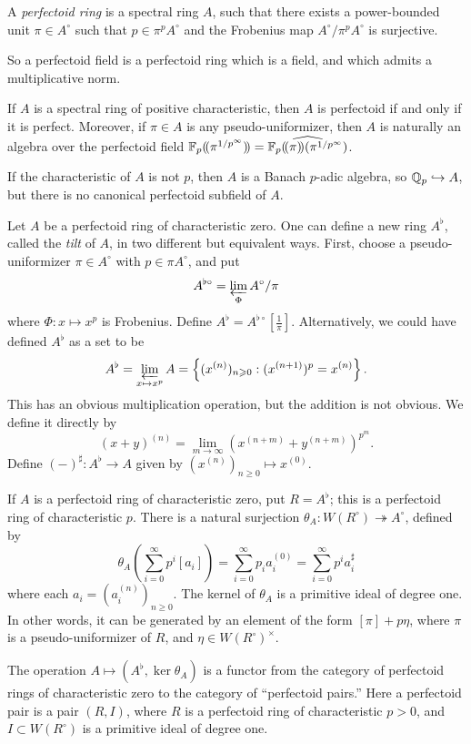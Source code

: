 \documentclass{article}
\begin{document}
\begin{definition}
A \emph{perfectoid ring} is a spectral ring $A$, such that there exists a 
power-bounded unit $\pi\in A^\circ$ such that $p\in \pi^p A^\circ$ and the 
Frobenius map $A^\circ/\pi^p A^\circ$ is surjective. 
\end{definition}

So a perfectoid field is a perfectoid ring which is a field, and which admits a multiplicative norm. 

If $A$ is a spectral ring of positive characteristic, then $A$ is perfectoid 
if and only if it is perfect. Moreover, if $\pi\in A$ is any 
pseudo-uniformizer, then $A$ is naturally an algebra over the perfectoid field 
$\mathbb{F}_p(\!( {\pi^{1/p^\infty}} )\!) = \widehat{\mathbb{F}_p(\!( {\pi} )\!) (\pi^{1/p^\infty})}$. 

If the characteristic of $A$ is not $p$, then $A$ is a Banach $p$-adic algebra, 
so $\mathbb{Q}_p\hookrightarrow A$, but there is no canonical perfectoid subfield of 
$A$. 

Let $A$ be a perfectoid ring of characteristic zero. One can define a new ring 
$A^\flat$, called the \emph{tilt} of $A$, in two different but equivalent ways. 
First, choose a pseudo-uniformizer $\pi\in A^\circ$ with $p\in \pi A^\circ$, 
and put 
\[
  A^{\flat\circ} = \varprojlim_\Phi A^\circ/\pi
\]
where $\Phi:x\mapsto x^p$ is Frobenius. Define 
$A^\flat=A^{\flat\circ}[\frac 1 \pi]$. Alternatively, we could have defined 
$A^\flat$ as a set to be  
\[
  A^\flat = \varprojlim_{x\mapsto x^p} A = \left\{(x^{(n)})_{n\geqslant 0}:(x^{(n+1)})^p = x^{(n)}\right\} .
\]
This has an obvious multiplication operation, but the addition is not obvious. 
We define it directly by 
\[
  (x+y)^{(n)} = \lim_{m\to \infty} (x^{(n+m)} + y^{(n+m)})^{p^m} .
\]
Define $(-)^\sharp:A^\flat \to A$ given by 
$(x^{(n)})_{n\geqslant 0} \mapsto x^{(0)}$. 

If $A$ is a perfectoid ring of characteristic zero, put $R=A^\flat$; this is 
a perfectoid ring of characteristic $p$. There is a natural surjection 
$\theta_A:W(R^\circ) \twoheadrightarrow A^\circ$, defined by 
\[
  \theta_A\left(\sum_{i=0}^\infty p^i [a_i]\right) = \sum_{i=0}^\infty p_i a_i^{(0)} = \sum_{i=0}^\infty p^i a_i^\sharp
\]
where each $a_i=(a_i^{(n)})_{n\geqslant 0}$. The kernel of 
$\theta_A$ is a primitive ideal of degree one. In other words, it can be 
generated by an element of the form $[\pi]+p\eta$, where $\pi$ is a 
pseudo-uniformizer of $R$, and $\eta\in W(R^\circ)^\times$. 

The operation $A\mapsto (A^\flat, \ker\theta_A)$ is a functor from the category 
of perfectoid rings of characteristic zero to the category of ``perfectoid 
pairs.'' Here a perfectoid pair is a pair $(R,I)$, where $R$ is a perfectoid 
ring of characteristic $p>0$, and $I\subset W(R^\circ)$ is a primitive ideal 
of degree one. 
\end{document}
